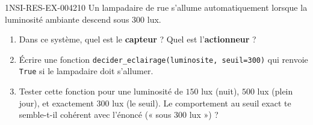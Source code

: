 \begin{exercice}{1NSI-RES-EX-004}{2}{10}
Un lampadaire de rue s'allume automatiquement lorsque la luminosité ambiante descend sous
$300$ lux.
\begin{enumerate}
  \item Dans ce système, quel est le \textbf{capteur} ? Quel est l'\textbf{actionneur} ?
  \item Écrire une fonction \lstinline{decider_eclairage(luminosite, seuil=300)} qui renvoie \lstinline{True} si le lampadaire doit s'allumer.
  \item Tester cette fonction pour une luminosité de $150$ lux (nuit), $500$ lux (plein jour), et exactement $300$ lux (le seuil). Le comportement au seuil exact te semble-t-il cohérent avec l'énoncé (« sous $300$ lux ») ?
\end{enumerate}
\end{exercice}
